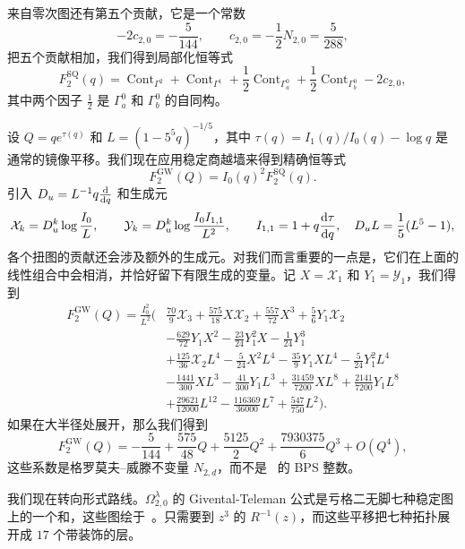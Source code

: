 \documentclass{amsart}
\theoremstyle{definition}
\theoremstyle{remark}
\theoremstyle{plain}
\theoremstyle{definition}
\theoremstyle{remark}
\newcommand{\mc}[1]{\mathcal{#1}}
\newcommand{\mr}[1]{\mathrm{#1}}
\newcommand{\1}{\mathbf{1}}
\newcommand{\2}{\mathbf{2}}
\newcommand{\3}{\mathbf{3}}
\DeclareMathOperator{\Cont}{Cont}
\begin{document}
来自零次图还有第五个贡献，它是一个常数
\[ -2c_{2,0} = -\frac{5}{144}, \qquad c_{2,0} = -\frac{1}{2}N_{2,0} = \frac{5}{288}, \]
把五个贡献相加，我们得到局部化恒等式
\[ F_2^{\mr{SQ}}(q) = \Cont_{\Gamma^2} + \Cont_{\Gamma^1} + \frac{1}{2}\Cont_{\Gamma_a^0} + \frac{1}{2}\Cont_{\Gamma_b^0} - 2c_{2,0}, \]
其中两个因子 \(\frac{1}{2}\) 是 \(\Gamma_a^0\) 和 \(\Gamma_b^0\) 的自同构。

设 \(Q = qe^{\tau(q)}\) 和 \(L = (1-5^5q)^{-1/5}\)，其中 \(\tau(q) = I_1(q)/I_0(q) - \log q\) 是通常的镜像平移。我们现在应用稳定商越墙来得到精确恒等式
\[ F_2^{\mr{GW}}(Q) = I_0(q)^2 F_2^{\mr{SQ}}(q). \]
引入 \(D_u = L^{-1}q\odv{}{q}\) 和生成元
\[ \mc{X}_k = D_u^k \log \frac{I_0}{L}, \qquad \mc{Y}_k = D_u^k \log \frac{I_0I_{1,1}}{L^2}, \qquad I_{1,1} = 1 + q \odv{\tau}{q}, \quad D_u L = \frac{1}{5}(L^5-1), \]
各个扭图的贡献还会涉及额外的生成元。对我们而言重要的一点是，它们在上面的线性组合中会相消，并恰好留下有限生成的变量。记 \(X = \mc{X}_1\) 和 \(Y_1 = \mc{Y}_1\)，我们得到
\begin{align*}
    F^{\mr{GW}}_2(Q) = \frac{I_0^2}{L^2}\Big(&\frac{70}{9}\mc{X}_3 + \frac{575}{18}X\mc{X}_2 + \frac{557}{72}X^3 + \frac{5}{6}Y_1\mc{X}_2 \\
    &- \frac{629}{72}Y_1X^2 - \frac{23}{24}Y_1^2 X - \frac{1}{24}Y_1^3 \\
    &+ \frac{125}{36}\mc{X}_2 L^4 - \frac{5}{24}X^2L^4 - \frac{35}{9}Y_1XL^4 - \frac{5}{24}Y_1^2L^4 \\
    &- \frac{1441}{300}XL^3 - \frac{41}{300}Y_1L^3 + \frac{31459}{7200}XL^8 + \frac{2141}{7200}Y_1L^8 \\
    &+ \frac{29621}{12000}L^{12} - \frac{116369}{36000}L^7 + \frac{547}{750}L^2\Big).
\end{align*}
如果在大半径处展开，那么我们得到
\[ F_2^{\mr{GW}}(Q) = -\frac{5}{144} + \frac{575}{48}Q + \frac{5125}{2}Q^2 + \frac{7930375}{6}Q^3 + O(Q^4), \]
这些系数是格罗莫夫–威滕不变量 \(N_{2,d}\)，而不是~ 的 BPS 整数。

我们现在转向形式路线。\(\Omega^{\lambda}_{2,0}\) 的 Givental-Teleman 公式是亏格二无脚七种稳定图上的一个和，这些图绘于~。只需要到 \(z^3\) 的 \(R^{-1}(z)\)，而这些平移把七种拓扑展开成 \(17\) 个带装饰的层。
\end{document}
